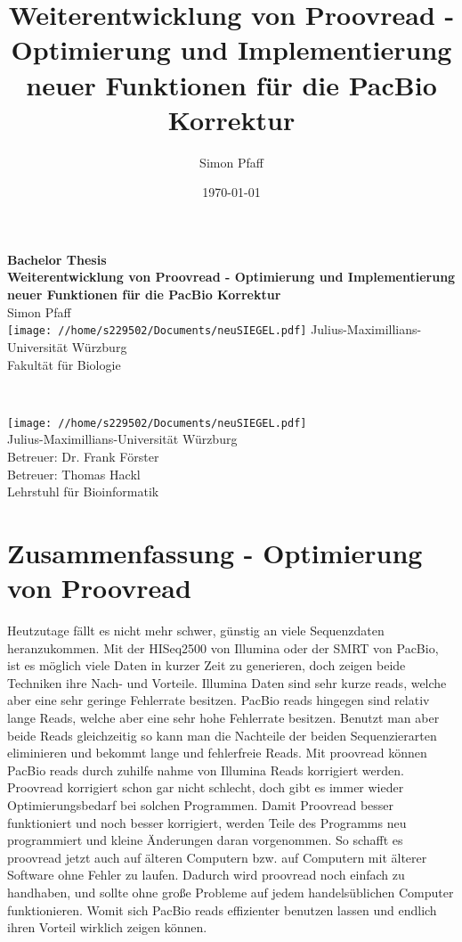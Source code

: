 \documentclass{scrartcl}
\author{Simon Pfaff}
\date{\today}
\title{Weiterentwicklung von Proovread - Optimierung und Implementierung neuer Funktionen für die PacBio Korrektur}
\begin{document}
\begin{center}
\thispagestyle{empty}
\textbf{\huge Bachelor Thesis}\\[1cm]
\textbf{\LARGE Weiterentwicklung von Proovread - Optimierung und Implementierung neuer Funktionen für die PacBio Korrektur}\\[1cm]
{\LARGE Simon Pfaff}\\[2mm]
\texttt{[image: //home/s229502/Documents/neuSIEGEL.pdf]}
{\large Julius-Maximillians-Universität Würzburg}\\[3mm]
{\large Fakultät für Biologie}
\end{center}
\cleardoublepage
\
\thispagestyle{empty}
\maketitle
\begin{center}
\texttt{[image: //home/s229502/Documents/neuSIEGEL.pdf]}\\[1cm]
{\large Julius-Maximillians-Universität Würzburg}\\
{\large Betreuer: Dr. Frank Förster}\\
{\large Betreuer: Thomas Hackl}\\
{\large Lehrstuhl für Bioinformatik}
\setcounter{page}{1}
\clearpage
\end{center}
\tableofcontents
\clearpage
\section{Zusammenfassung - Optimierung von Proovread}
\label{sec-1}
Heutzutage fällt es nicht mehr schwer, günstig an viele Sequenzdaten heranzukommen. Mit der HISeq2500 von Illumina oder der SMRT von PacBio, ist es 
möglich viele Daten in kurzer Zeit zu generieren, doch zeigen beide Techniken ihre Nach- und Vorteile. Illumina Daten sind sehr kurze reads, welche aber eine
sehr geringe Fehlerrate besitzen. PacBio reads hingegen sind relativ lange Reads, welche aber eine sehr hohe Fehlerrate besitzen. Benutzt man aber beide
Reads gleichzeitig so kann man die Nachteile der beiden Sequenzierarten eliminieren und bekommt lange und fehlerfreie Reads.
Mit proovread können PacBio reads durch zuhilfe nahme von Illumina Reads korrigiert werden. Proovread korrigiert schon gar nicht schlecht, doch gibt es immer wieder
Optimierungsbedarf bei solchen Programmen. Damit Proovread besser funktioniert und noch besser korrigiert, werden Teile des Programms neu programmiert und kleine 
Änderungen daran vorgenommen. So schafft es proovread jetzt auch auf älteren Computern bzw. auf Computern mit älterer Software ohne Fehler zu laufen. 
Dadurch wird proovread noch einfach zu handhaben, und sollte ohne große Probleme auf jedem handelsüblichen Computer funktionieren. Womit sich PacBio reads 
effizienter benutzen lassen und endlich ihren Vorteil wirklich zeigen können.
\clearpage
\end{document}
